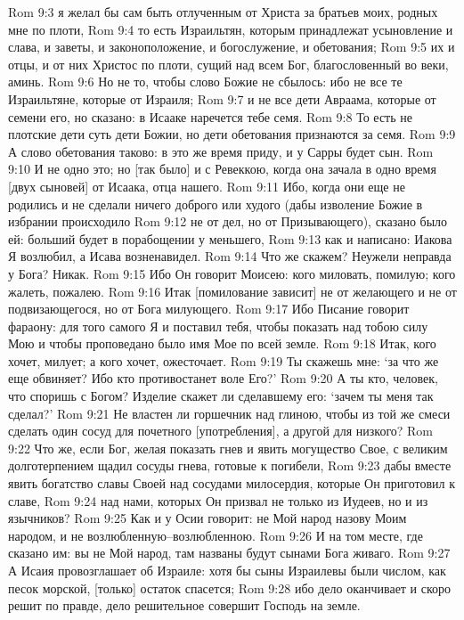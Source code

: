 Rom 9:3  я желал бы сам быть отлученным от Христа за братьев моих, родных мне по плоти,
Rom 9:4  то есть Израильтян, которым принадлежат усыновление и слава, и заветы, и законоположение, и богослужение, и обетования;
Rom 9:5  их и отцы, и от них Христос по плоти, сущий над всем Бог, благословенный во веки, аминь.
Rom 9:6  Но не то, чтобы слово Божие не сбылось: ибо не все те Израильтяне, которые от Израиля;
Rom 9:7  и не все дети Авраама, которые от семени его, но сказано: в Исааке наречется тебе семя.
Rom 9:8  То есть не плотские дети суть дети Божии, но дети обетования признаются за семя.
Rom 9:9  А слово обетования таково: в это же время приду, и у Сарры будет сын.
Rom 9:10  И не одно это; но [так было] и с Ревеккою, когда она зачала в одно время [двух сыновей] от Исаака, отца нашего.
Rom 9:11  Ибо, когда они еще не родились и не сделали ничего доброго или худого (дабы изволение Божие в избрании происходило
Rom 9:12  не от дел, но от Призывающего), сказано было ей: больший будет в порабощении у меньшего,
Rom 9:13  как и написано: Иакова Я возлюбил, а Исава возненавидел.
Rom 9:14  Что же скажем? Неужели неправда у Бога? Никак.
Rom 9:15  Ибо Он говорит Моисею: кого миловать, помилую; кого жалеть, пожалею.
Rom 9:16  Итак [помилование зависит] не от желающего и не от подвизающегося, но от Бога милующего.
Rom 9:17  Ибо Писание говорит фараону: для того самого Я и поставил тебя, чтобы показать над тобою силу Мою и чтобы проповедано было имя Мое по всей земле.
Rom 9:18  Итак, кого хочет, милует; а кого хочет, ожесточает.
Rom 9:19  Ты скажешь мне: `за что же еще обвиняет? Ибо кто противостанет воле Его?'
Rom 9:20  А ты кто, человек, что споришь с Богом? Изделие скажет ли сделавшему его: `зачем ты меня так сделал?'
Rom 9:21  Не властен ли горшечник над глиною, чтобы из той же смеси сделать один сосуд для почетного [употребления], а другой для низкого?
Rom 9:22  Что же, если Бог, желая показать гнев и явить могущество Свое, с великим долготерпением щадил сосуды гнева, готовые к погибели,
Rom 9:23  дабы вместе явить богатство славы Своей над сосудами милосердия, которые Он приготовил к славе,
Rom 9:24  над нами, которых Он призвал не только из Иудеев, но и из язычников?
Rom 9:25  Как и у Осии говорит: не Мой народ назову Моим народом, и не возлюбленную--возлюбленною.
Rom 9:26  И на том месте, где сказано им: вы не Мой народ, там названы будут сынами Бога живаго.
Rom 9:27  А Исаия провозглашает об Израиле: хотя бы сыны Израилевы были числом, как песок морской, [только] остаток спасется;
Rom 9:28  ибо дело оканчивает и скоро решит по правде, дело решительное совершит Господь на земле.
